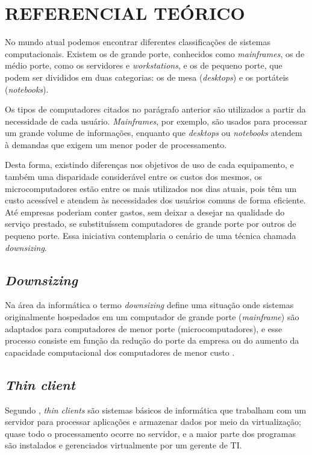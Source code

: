 \chapter{REFERENCIAL TEÓRICO}

No mundo atual podemos encontrar diferentes classificações de sistemas computacionais. Existem os de grande porte, conhecidos como \textit{mainframes}, os de médio porte, como os servidores e \textit{workstations}, e os de pequeno porte, que podem ser divididos em duas categorias: os de mesa (\textit{desktops}) e os portáteis (\textit{notebooks}).

Os tipos de computadores citados no parágrafo anterior são utilizados a partir da necessidade de cada usuário. \textit{Mainframes}, por exemplo, são usados para processar um grande volume de informações, enquanto que \textit{desktops} ou \textit{notebooks} atendem à demandas que exigem um menor poder de processamento.

Desta forma, existindo diferenças nos objetivos de uso de cada equipamento, e também uma disparidade considerável entre os custos dos mesmos, os microcomputadores estão entre os mais utilizados nos dias atuais, pois têm um custo acessível e atendem às necessidades dos usuários comuns de forma eficiente. Até empresas poderiam conter gastos, sem deixar a desejar na qualidade do serviço prestado, se substituíssem computadores de grande porte por outros de pequeno porte. Essa iniciativa contemplaria o cenário de uma técnica chamada \textit{downsizing}.

\section{\textit{Downsizing}}

Na área da informática o termo \textit{downsizing} define uma situação onde sistemas originalmente hospedados em um computador de grande porte (\textit{mainframe}) são adaptados para computadores de menor porte (microcomputadores), e esse processo consiste em função da redução do porte da empresa ou do aumento da capacidade computacional dos computadores de menor custo \cite{WIKIPEDIA3}.

\section{\textit{Thin client}}

Segundo , \textit{thin clients} são sistemas básicos de informática que trabalham com um servidor para processar aplicações e armazenar dados por meio da virtualização; quase todo o processamento ocorre no servidor, e a maior parte dos programas são instalados e gerenciados virtualmente por um gerente de TI.

